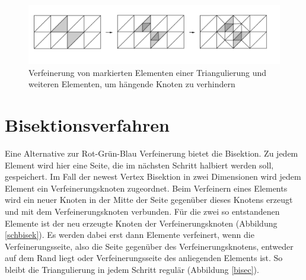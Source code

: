 \begin{figure}[!htbp]
	\begin{center}
		\includegraphics[width=16cm]{pics/refin.png}
	\end{center}
	\caption{Verfeinerung von markierten Elementen einer Triangulierung und weiteren Elementen, um hängende Knoten zu verhindern}
\end{figure}

\section{Bisektionsverfahren}
Eine Alternative zur Rot-Grün-Blau Verfeinerung bietet die Bisektion. Zu jedem Element wird hier eine Seite, die im nächsten Schritt halbiert werden soll, gespeichert. Im Fall der newest Vertex Bisektion in zwei Dimensionen wird jedem Element ein Verfeinerungsknoten zugeordnet. Beim Verfeinern eines Elements wird ein neuer Knoten in der Mitte der Seite gegenüber dieses Knotens erzeugt und mit dem Verfeinerungsknoten verbunden. Für die zwei so entstandenen Elemente ist der neu erzeugte Knoten der Verfeinerungsknoten (Abbildung \ref{schbisek}). Es werden dabei erst dann Elemente verfeinert, wenn die Verfeinerungsseite, also die Seite gegenüber des Verfeinerungsknotens, entweder auf dem Rand liegt oder Verfeinerungsseite des anliegenden Elements ist. So bleibt die Triangulierung in jedem Schritt regulär (Abbildung \ref{bisec}).

